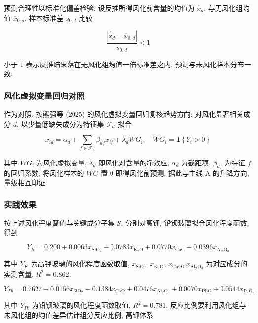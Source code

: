 \documentclass{ctexart}
\begin{document}
预测合理性以标准化偏差检验: 设反推所得风化前含量的均值为 $\overline{\widehat{x}}_{d}$, 与无风化组均值 $\overline{x}_{0,d}$, 样本标准差 $s_{0,d}$ 比较

\begin{equation*}
\frac{\left|\overline{\widehat{x}}_{d}-\overline{x}_{0,d}\right|}{s_{0,d}}<1
\end{equation*}

小于 $1$ 表示反推结果落在无风化组均值一倍标准差之内, 预测与未风化样本分布一致.


\subsubsection{风化虚拟变量回归对照}

作为对照, 按熊强等 (2025) 的风化虚拟变量回归复核趋势方向: 对风化显著相关成分 $d$, 以少量低缺失成分为特征集 $\mathcal{F}_d$ 拟合

\begin{equation*}
x_{id}=\alpha_{d}+\sum_{f\in\mathcal{F}_d}\beta_{df}x_{if}+\lambda_{d}WG_i,\quad{W}G_i=\mathbf{1}\left\{Y_i>0\right\}
\end{equation*}

其中 $WG_i$ 为风化虚拟变量, $\lambda_d$ 即风化对含量的净效应, $\alpha_d$ 为截距项, $\beta_{df}$ 为特征 $f$ 的回归系数; 将风化样本的 $WG$ 置 $0$ 即得风化前预测, 据此与主线 A 的升降方向, 量级相互印证.


\subsubsection{实践效果}

按上述风化程度赋值与关键成分子集 $\mathcal{S}$, 分别对高钾, 铅钡玻璃拟合风化程度函数, 得到

\begin{equation*}
Y_K=0.200+0.0063x_{\mathrm{SiO_2}}-0.0783x_{\mathrm{K_2O}}+0.0770x_{\mathrm{CaO}}-0.0396x_{\mathrm{Al_2O_3}}
\end{equation*}

其中 $Y_K$ 为高钾玻璃的风化程度函数取值, $x_{\mathrm{SiO_2}}$, $x_{\mathrm{K_2O}}$, $x_{\mathrm{CaO}}$, $x_{\mathrm{Al_2O_3}}$ 为对应成分的实测含量, $R^2=0.862$;

\begin{equation*}
Y_{Pb}=0.7627-0.0156x_{\mathrm{SiO_2}}-0.1384x_{\mathrm{CaO}}+0.0476x_{\mathrm{Al_2O_3}}+0.0070x_{\mathrm{PbO}}+0.0544x_{\mathrm{P_2O_5}}
\end{equation*}

其中 $Y_{Pb}$ 为铅钡玻璃的风化程度函数取值, $R^2=0.781$. 反应比例要利用风化组与未风化组的均值差异估计组分反应比例, 高钾体系
\end{document}
